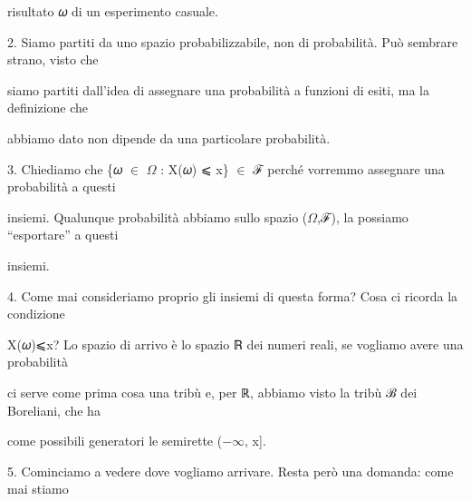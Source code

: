 \documentclass[a4paper,portrait,12pt]{article}
\begin{document}
\begin{flushleft}
risultato 𝜔 di un esperimento casuale.
\end{flushleft}


\begin{flushleft}
2. Siamo partiti da uno spazio probabilizzabile, non di probabilit\`{a}. Pu\`{o} sembrare strano, visto che
\end{flushleft}


\begin{flushleft}
siamo partiti dall'idea di assegnare una probabilit\`{a} a funzioni di esiti, ma la definizione che
\end{flushleft}


\begin{flushleft}
abbiamo dato non dipende da una particolare probabilit\`{a}.
\end{flushleft}


\begin{flushleft}
3. Chiediamo che \{𝜔 $\in$ $\Omega$ : X(𝜔) ⩽ x\} $\in$ ℱ perch\'{e} vorremmo assegnare una probabilit\`{a} a questi
\end{flushleft}


\begin{flushleft}
insiemi. Qualunque probabilit\`{a} abbiamo sullo spazio ($\Omega$,ℱ), la possiamo {``}esportare'' a questi
\end{flushleft}


\begin{flushleft}
insiemi.
\end{flushleft}


\begin{flushleft}
4. Come mai consideriamo proprio gli insiemi di questa forma? Cosa ci ricorda la condizione
\end{flushleft}


\begin{flushleft}
X(𝜔)⩽x? Lo spazio di arrivo \`{e} lo spazio ℝ dei numeri reali, se vogliamo avere una probabilit\`{a}
\end{flushleft}


\begin{flushleft}
ci serve come prima cosa una tribù e, per ℝ, abbiamo visto la tribù ℬ dei Boreliani, che ha
\end{flushleft}


\begin{flushleft}
come possibili generatori le semirette ($-$$\infty$, x].
\end{flushleft}


\begin{flushleft}
5. Cominciamo a vedere dove vogliamo arrivare. Resta per\`{o} una domanda: come mai stiamo
\end{flushleft}
\end{document}
